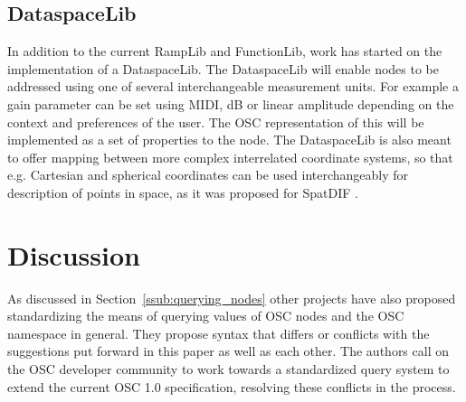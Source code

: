 \documentclass{NIME-alternate}
\begin{document}





\subsection{DataspaceLib} %
\label{sub:dataspacelib}

In addition to the current RampLib and FunctionLib, work has started on the implementation of a DataspaceLib.  The DataspaceLib will enable nodes to be addressed using one of several interchangeable measurement units. For example a gain parameter can be set using MIDI, dB or linear amplitude depending on the context and preferences of the user. The OSC representation of this will be implemented as a set of properties to the node. The DataspaceLib is also meant to offer mapping between more complex interrelated coordinate systems, so that e.g. Cartesian and spherical coordinates can be used interchangeably for description of points in space, as it was proposed for SpatDIF \cite{peters_caa07}.






\section{Discussion} %
\label{sec:discussion}   


As discussed in Section~\ref{ssub:querying_nodes} other projects have also proposed standardizing the means of querying values of OSC nodes and the OSC namespace in general.  They propose syntax that differs or conflicts with the suggestions put forward in this paper as well as each other. The authors call on the OSC developer community to work towards a standardized query system to extend the current OSC 1.0 specification, resolving these conflicts in the process. 
\end{document}
